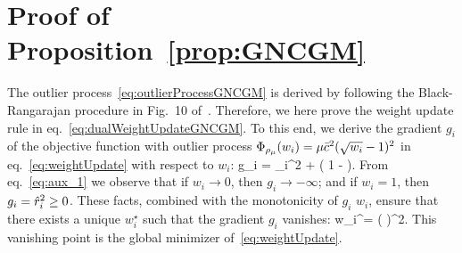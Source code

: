 
\section{Proof of Proposition~\ref{prop:GNCGM}}
The outlier process~\eqref{eq:outlierProcessGNCGM} is derived by following the Black-Rangarajan procedure in Fig.~10 of~\cite{Black96ijcv-unification}. Therefore, we here prove the weight update rule in eq.~\eqref{eq:dualWeightUpdateGNCGM}. To this end, we derive the gradient $g_i$ of the objective function with outlier process $\Phi_{\rho_{\mu}}(w_i) = \mu\bar{c}^2(\sqrt{w_i} - 1)^2$ in eq.~\eqref{eq:weightUpdate} with respect to $w_i$:
\bea\label{eq:aux_1}
g_i = \hatr_i^2 + \mu \barcsq \left( 1 -  \right).
\eea
From eq.~\eqref{eq:aux_1} we observe that if $w_i \rightarrow 0$, then $g_i \rightarrow -\infty$; and if $w_i = 1$, then $g_i = \hat{r}_i^2 \geq 0$. These facts, combined with the monotonicity of $g_i$ \wrt $w_i$, ensure that there exists a unique $w_i^\star$ such that the gradient $g_i$ vanishes:
\bea \label{eq:dualUpdateGM}
w_i^\star = \left(  \right)^2.
\eea
This vanishing point is the global minimizer of~\eqref{eq:weightUpdate}.
